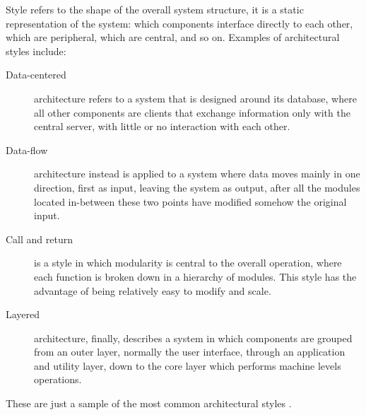 Style refers to the shape of the overall system structure, it is a static
representation of the system: which components interface directly to
each other, which are peripheral, which are central, and so on. Examples of
architectural styles include:
\begin{description}
\item[Data-centered] architecture refers to a system that is designed around its
database, where all other components are clients that exchange information only
with the central server, with little or no interaction with each other.
\item[Data-flow] architecture instead is applied to a system where data moves
mainly in one direction, first as input, leaving the system as output, after all
the modules located in-between these two points have modified somehow the
original input.
\item[Call and return] is a style in which modularity is central to the overall
operation, where each function is broken down in a hierarchy of modules. This
style has the advantage of being relatively easy to modify and scale.
\item[Layered] architecture, finally, describes a system in which components are
grouped from an outer layer, normally the user interface, through an application
and utility layer, down to the core layer which performs machine levels
operations.
\end{description}
These are just a sample of the most common architectural styles \cite{RP05}.

